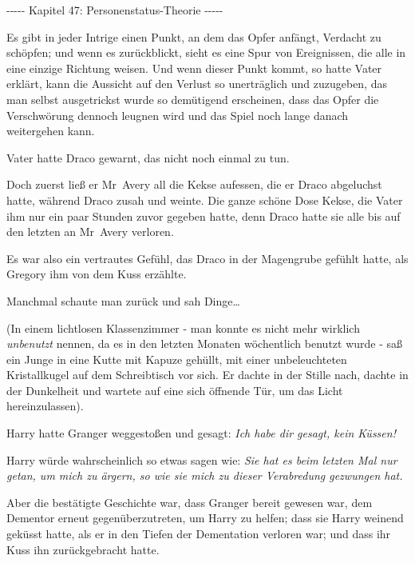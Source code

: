 

\hypertarget{personenstatus-theorie}{%

-\/-\/-\/-\/- Kapitel 47: Personenstatus-Theorie -\/-\/-\/-\/-

Es gibt in jeder Intrige einen Punkt, an dem das Opfer anfängt, Verdacht zu schöpfen; und wenn es zurückblickt, sieht es eine Spur von Ereignissen, die alle in eine einzige Richtung weisen. Und wenn dieser Punkt kommt, so hatte Vater erklärt, kann die Aussicht auf den Verlust so unerträglich und zuzugeben, das man selbst ausgetrickst wurde so demütigend erscheinen, dass das Opfer die Verschwörung dennoch leugnen wird und das Spiel noch lange danach weitergehen kann.

Vater hatte Draco gewarnt, das nicht noch einmal zu tun.

Doch zuerst ließ er Mr~Avery all die Kekse aufessen, die er Draco abgeluchst hatte, während Draco zusah und weinte. Die ganze schöne Dose Kekse, die Vater ihm nur ein paar Stunden zuvor gegeben hatte, denn Draco hatte sie alle bis auf den letzten an Mr~Avery verloren.

Es war also ein vertrautes Gefühl, das Draco in der Magengrube gefühlt hatte, als Gregory ihm von dem Kuss erzählte.

Manchmal schaute man zurück und sah Dinge…

(In einem lichtlosen Klassenzimmer - man konnte es nicht mehr wirklich \emph{unbenutzt} nennen, da es in den letzten Monaten wöchentlich benutzt wurde - saß ein Junge in eine Kutte mit Kapuze gehüllt, mit einer unbeleuchteten Kristallkugel auf dem Schreibtisch vor sich. Er dachte in der Stille nach, dachte in der Dunkelheit und wartete auf eine sich öffnende Tür, um das Licht hereinzulassen).

Harry hatte Granger weggestoßen und gesagt: \emph{Ich habe dir gesagt, kein Küssen!}

Harry würde wahrscheinlich so etwas sagen wie: \emph{Sie hat es beim letzten Mal nur getan, um mich zu ärgern, so wie sie mich zu dieser Verabredung gezwungen hat.}

Aber die bestätigte Geschichte war, dass Granger bereit gewesen war, dem Dementor erneut gegenüberzutreten, um Harry zu helfen; dass sie Harry weinend geküsst hatte, als er in den Tiefen der Dementation verloren war; und dass ihr Kuss ihn zurückgebracht hatte.

}
